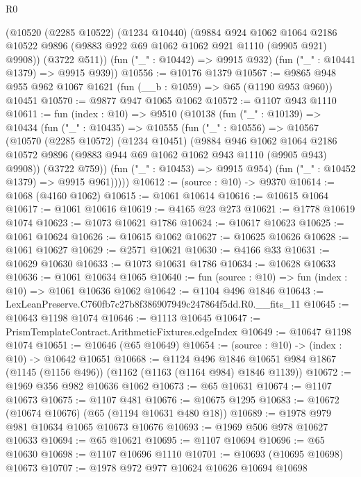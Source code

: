 \begin{lexlean}{R0}
\begin{coremodule}
      (@10520
        (@2285 @10522)
        (@1234 @10440)
        (@9884
          @924
          @1062
          @1064
          @2186
          @10522
          @9896
          (@9883 @922 @69 @1062 @1062 @921 @1110 (@9905 @921) @9908))
        (@3722 @511))
      (fun ("_" : @10442) => @9915 @932)
      (fun ("_" : @10441 @1379) => @9915 @939))
@10556 := @10176 @1379
@10567 := @9865 @948 @955 @962 @1067 @1621 (fun (__b : @1059) => @65 (@1190 @953 @960)) @10451
@10570 := @9877 @947 @1065 @1062
@10572 := @1107 @943 @1110
@10611 := fun (index : @10) =>
  @9510
    (@10138
      (fun ("_" : @10139) =>
      @10434
        (fun ("_" : @10435) =>
        @10555
          (fun ("_" : @10556) =>
          @10567
            (@10570
              (@2285 @10572)
              (@1234 @10451)
              (@9884
                @946
                @1062
                @1064
                @2186
                @10572
                @9896
                (@9883 @944 @69 @1062 @1062 @943 @1110 (@9905 @943) @9908))
              (@3722 @759))
            (fun ("_" : @10453) => @9915 @954)
            (fun ("_" : @10452 @1379) => @9915 @961)))))
@10612 := (source : @10) -> @9370
@10614 := @1068 (@4160 @1062)
@10615 := @1061 @10614
@10616 := @10615 @1064
@10617 := @1061 @10616
@10619 := @4165 @23 @273
@10621 := @1778 @10619 @1074
@10623 := @1073 @10621 @1786
@10624 := @10617 @10623
@10625 := @1061 @10624
@10626 := @10615 @1062
@10627 := @10625 @10626
@10628 := @1061 @10627
@10629 := @2571 @10621
@10630 := @4166 @33
@10631 := @10629 @10630
@10633 := @1073 @10631 @1786
@10634 := @10628 @10633
@10636 := @1061 @10634 @1065
@10640 := fun (source : @10) => fun (index : @10) => @1061 @10636 @1062
@10642 := @1104 @496 @1846
@10643 := LexLeanPreserve.C760fb7c27b8f386907949c247864f5dd.R0.__fits_11
@10645 := @10643 @1198 @1074
@10646 := @1113 @10645
@10647 := PrismTemplateContract.ArithmeticFixtures.edgeIndex
@10649 := @10647 @1198 @1074
@10651 := @10646 (@65 @10649)
@10654 := (source : @10) -> (index : @10) -> @10642 @10651
@10668 := @1124
    @496
    @1846
    @10651
    @984
    @1867
    (@1145 (@1156 @496))
    (@1162 (@1163 (@1164 @984) @1846 @1139))
@10672 := @1969 @356 @982 @10636 @1062
@10673 := @65 @10631
@10674 := @1107 @10673
@10675 := @1107 @481
@10676 := @10675 @1295
@10683 := @10672 (@10674 @10676) (@65 (@1194 @10631 @480 @18))
@10689 := @1978 @979 @981 @10634 @1065 @10673 @10676
@10693 := @1969 @506 @978 @10627 @10633
@10694 := @65 @10621
@10695 := @1107 @10694
@10696 := @65 @10630
@10698 := @1107 @10696 @1110
@10701 := @10693 (@10695 @10698) @10673
@10707 := @1978 @972 @977 @10624 @10626 @10694 @10698

\end{coremodule}
\end{lexlean}
